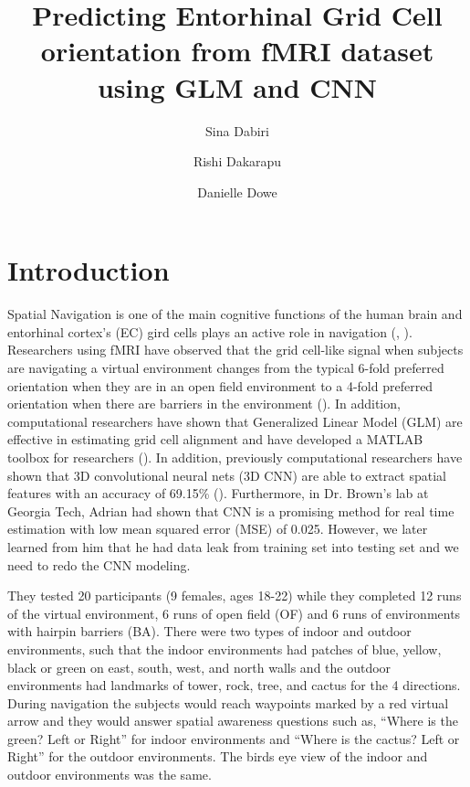 \documentclass[a4paper]{article}
\title{\textbf{Predicting Entorhinal Grid Cell orientation from fMRI dataset using GLM and CNN}}
\author[1]{Sina Dabiri}
\author[2]{Rishi Dakarapu}
\author[3]{Danielle Dowe}
\affil[1]{Department of Biomedical Engineering, Georgia Institute of Technology, Atlanta, Georgia}
\affil[2]{Department of Biomedical Engineering, Georgia Institute of Technology, Atlanta, Georgia}
\affil[3]{Department of Machine Learning, Georgia Institute of Technology, Atlanta, Georgia}
\date{} %
\begin{document}
\maketitle

\section{Introduction}
\label{sec:introduction}

Spatial Navigation is one of the main cognitive functions of the human brain and entorhinal cortex’s (EC) gird cells plays an active role in navigation (\cite{hafting_microstructure_2005}, \cite{yartsev_grid_2011}). Researchers using fMRI have observed that the grid cell-like signal when subjects are navigating a virtual environment changes from the typical 6-fold preferred orientation when they are in an open field environment to a 4-fold preferred orientation when there are barriers in the environment (\cite{he_environmental_2019}). In addition, computational researchers have shown that Generalized Linear Model (GLM) are effective in estimating grid cell alignment and have developed a MATLAB toolbox for researchers (\cite{stangl_gridcat_2017}). In addition, previously computational researchers have shown that 3D convolutional neural nets (3D CNN) are able to extract spatial features with an accuracy of 69.15\% (\cite{zou_3d_2017}). Furthermore, in Dr. Brown’s lab at Georgia Tech, Adrian had shown that CNN is a promising method for real time estimation with low mean squared error (MSE) of 0.025. However, we later learned from him that he had data leak from training set into testing set and we need to redo the CNN modeling. 

 They tested 20 participants (9 females, ages 18-22) while they completed 12 runs of the virtual environment, 6 runs of open field (OF) and 6 runs of environments with hairpin barriers (BA). There were two types of indoor and outdoor environments, such that the indoor environments had patches of blue, yellow, black or green on east, south, west, and north walls and the outdoor environments had landmarks of tower, rock, tree, and cactus for the 4 directions. During navigation the subjects would reach waypoints marked by a red virtual arrow and they would answer spatial awareness questions such as, “Where is the green? Left or Right” for indoor environments and “Where is the cactus? Left or Right” for the outdoor environments. The birds eye view of the indoor and outdoor environments was the same.
\end{document}
